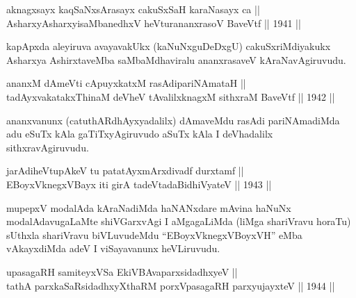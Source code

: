 \begin{shl}
aknagxsayx kaqSaNxsArasayx cakuSxSaH karaNasayx ca || \\
AsharxyAsharxyisaMbanedhxV heVturananxrasoV BaveVtf \hfill || 1941 ||
  
\end{shl}

\begin{artha}
kapApxda aleyiruva avayavakUkx (kaNuNxguDeDxgU) cakuSxriMdiyakukx
Asharxya AshirxtaveMba saMbaMdhaviralu ananxrasaveV kAraNavAgiruvudu.
\end{artha}


\begin{shl}
ananxM dAmeVti cApuyxkatxM rasAdipariNAmataH || \\
tadAyxvakatakxThinaM deVheV tAvalilxknagxM sithxraM BaveVtf \hfill || 1942 ||
  
\end{shl}

\begin{artha}
ananxvanunx (catuthARdhAyxyadalilx) dAmaveMdu rasAdi pariNAmadiMda adu
eSuTx kAla gaTiTxyAgiruvudo aSuTx kAla I deVhadalilx sithxravAgiruvudu.
\end{artha}


\begin{shl}
jarAdiheVtupAkeV tu patatAyxmArxdivadf durxtamf || \\
EBoyxV\s knegxVBayx iti girA tadeVtadaBidhiVyateV \hfill || 1943 ||
  
\end{shl}

\begin{artha}
mupepxV modalAda kAraNadiMda haNANxdare mAvina haNuNx
modalAdavugaLaMte shiVGarxvAgi I aMgagaLiMda (liMga shariVravu horaTu)
sUthxla shariVravu biVLuvudeMdu ``EBoyxV\s knegxVBoyxVH'' eMba vAkayxdiMda adeV I
viSayavanunx heVLiruvudu.
\end{artha}


\begin{shl}
upasagaRH samiteyxVSa EkiVBAvaparxsidadhxyeV || \\
tathA parxkaSaRsidadhxyXthaRM porxVpasagaRH parxyujayxteV \hfill || 1944 ||
  
\end{shl}

